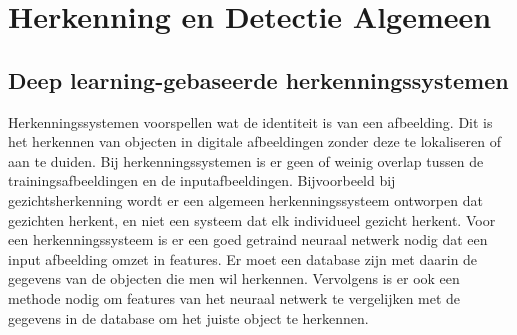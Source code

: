 \chapter{Herkenning en Detectie Algemeen}

\section{Deep learning-gebaseerde herkenningssystemen}
Herkenningssystemen voorspellen wat de identiteit is van een afbeelding. 
Dit is het herkennen van objecten in digitale afbeeldingen zonder deze te lokaliseren of aan te duiden. 
Bij herkenningssystemen is er geen of weinig overlap tussen de trainingsafbeeldingen en de inputafbeeldingen.
Bijvoorbeeld bij gezichtsherkenning wordt er een algemeen herkenningssysteem ontworpen dat gezichten herkent, en niet een systeem dat elk individueel gezicht herkent.
Voor een herkenningssysteem is er een goed getraind neuraal netwerk nodig dat een input afbeelding omzet in features. 
Er moet een database zijn met daarin de gegevens van de objecten die men wil herkennen. 
Vervolgens is er ook een methode nodig om features van het neuraal netwerk te vergelijken met de gegevens in de database om het juiste object te herkennen.

